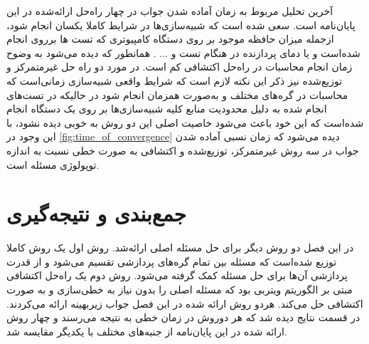	آخرین تحلیل مربوط به زمان آماده شدن جواب در چهار راه‌حل ارائه‌شده در این پایان‌نامه است. سعی شده است که شبیه‌سازی‌ها در شرایط کاملا یکسان انجام شود، ازجمله میزان حافظه موجود بر روی دستگاه کامپیوتری که تست ها برروی انجام شده‌است و یا دمای پردازنده در هنگام تست و ... . همانطور که دیده می‌شود به وضوح زمان انجام محاسبات در راه‌حل اکتشافی کم است. در مورد دو راه حل غیرمتمرکز و توزیع‌شده نیز ذکر این نکته لازم است که شرایط واقعی شبیه‌سازی زمانی‌است که محاسبات در گره‌های مختلف و به‌صورت همزمان انجام شود در حالیکه در تست‌های انجام شده به دلیل محدودیت منابع کلیه شبیه‌سازی‌ها بر روی یک دستگاه انجام شده‌است که این خود باعث می‌شود خاصیت اصلی این دو روش به خوبی دیده نشود، با این وجود در \cref{fig:time_of_convergence} دیده می‌شود که زمان نسبی آماده شدن جواب در سه روش غیرمتمرکز، توزیع‌شده و اکتشافی به صورت خطی نسبت به اندازه توپولوژی مسئله است.
	
	\section{جمع‌بندی و نتیجه‌گیری}
	در این فصل دو روش دیگر برای حل مسئله اصلی ارائه‌شد. 
	روش اول یک روش کاملا توزیع شده‌است که مسئله بین تمام گره‌های پردازشی تقسیم می‌شود و از قدرت پردازشی آن‌ها برای حل مسئله کمک گرفته می‌شود.
	روش دوم یک راه‌حل اکتشافی مبتی بر الگوریتم ویتربی بود که مسئله اصلی را بدون نیاز به خطی‌سازی و به صورت اکتشافی حل می‌کند. 
	هردو روش ارائه شده در این فصل جواب زیر‌بهینه ارائه می‌کردند. 
	در قسمت نتایج دیده شد که هر دوروش در زمان خطی به نتیجه می‌رسند و چهار روش ارائه شده در این پایان‌نامه از جنبه‌های مختلف با یکدیگر مقایسه شد. 

